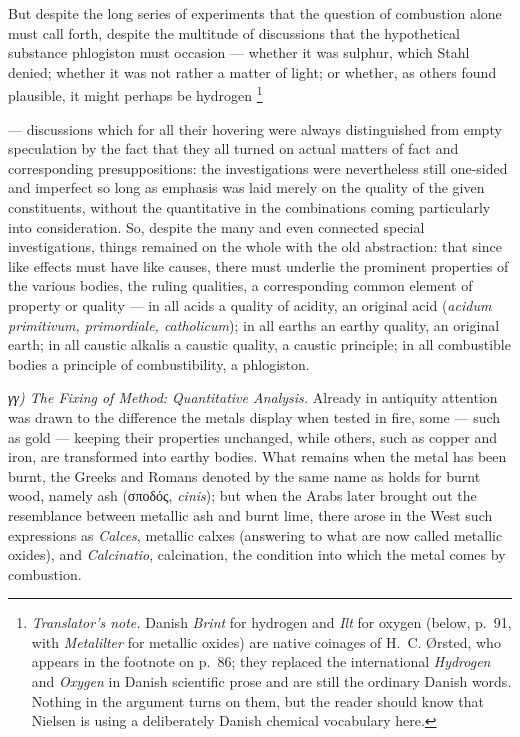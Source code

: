 \documentclass[12pt,a4paper]{book}
\renewcommand{\thefootnote}{\ifcase\value{footnote}\or *)\or **)\or ***)\fi}
\newcommand{\tnote}[1]{%
  \begingroup
  \renewcommand{\thefootnote}{\textdagger}%
  \footnote{\emph{Translator's note.} #1}%
  \addtocounter{footnote}{-1}%
  \endgroup}
\begin{document}
But despite the long series of experiments that the question of combustion
alone must call forth, despite the multitude of discussions that the
hypothetical substance phlogiston must occasion --- whether it was sulphur,
which Stahl denied; whether it was not rather a matter of light; or whether, as
others found plausible, it might perhaps be hydrogen\tnote{Danish
\emph{Brint} for hydrogen and \emph{Ilt} for oxygen (below, p.~91, with
\emph{Metalilter} for metallic oxides) are native coinages of H.~C. Ørsted,
who appears in the footnote on p.~86; they replaced the international
\emph{Hydrogen} and \emph{Oxygen} in Danish scientific prose and are still the
ordinary Danish words. Nothing in the argument turns on them, but the reader
should know that Nielsen is using a deliberately Danish chemical vocabulary
here.} --- discussions which for all their hovering were always distinguished
from empty speculation by the fact that they all turned on actual matters of
fact and corresponding presuppositions: the investigations were nevertheless
still one-sided and imperfect so long as emphasis was laid merely on the
quality of the given
constituents, without the quantitative in the combinations coming particularly
into consideration. So, despite the many and even connected special
investigations, things remained on the whole with the old abstraction: that
since like effects must have like causes, there must underlie the prominent
properties of the various bodies, the ruling qualities, a corresponding common
element of property or quality --- in all acids a quality of acidity, an
original acid (\textit{acidum primitivum, primordiale, catholicum}); in all
earths an earthy quality, an original earth; in all caustic alkalis a caustic
quality, a caustic principle; in all combustible bodies a principle of
combustibility, a phlogiston.

\emph{γγ) The Fixing of Method: Quantitative Analysis.} Already in antiquity
attention was drawn to the difference the metals display when tested in fire,
some --- such as gold --- keeping their properties unchanged, while others,
such as copper and iron, are transformed into earthy bodies. What remains when
the metal has been burnt, the Greeks and Romans denoted by the same name as
holds for burnt wood, namely ash (σποδός, \textit{cinis}); but when the Arabs
later brought out the resemblance between metallic ash and burnt lime, there
arose in the West such expressions as \textit{Calces}, metallic calxes
(answering to what are now called metallic oxides), and \textit{Calcinatio},
calcination, the condition into which the metal comes by combustion.
\end{document}
